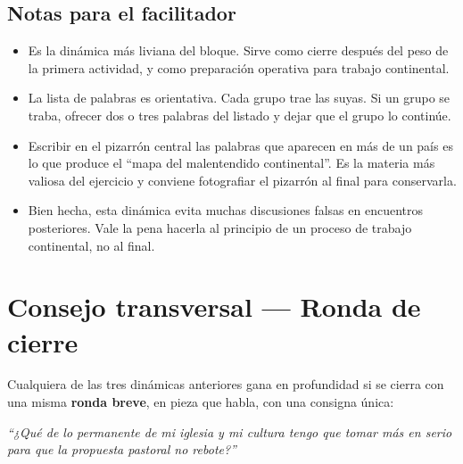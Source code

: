 \documentclass[11pt, a4paper]{article}
\begin{document}
\begin{actividad}
\subsection*{Notas para el facilitador}
\begin{itemize}
  \item Es la dinámica más liviana del bloque. Sirve como cierre después del peso de la primera actividad, y como preparación operativa para trabajo continental.
  \item La lista de palabras es orientativa. Cada grupo trae las suyas. Si un grupo se traba, ofrecer dos o tres palabras del listado y dejar que el grupo lo continúe.
  \item Escribir en el pizarrón central las palabras que aparecen en más de un país es lo que produce el ``mapa del malentendido continental''. Es la materia más valiosa del ejercicio y conviene fotografiar el pizarrón al final para conservarla.
  \item Bien hecha, esta dinámica evita muchas discusiones falsas en encuentros posteriores. Vale la pena hacerla al principio de un proceso de trabajo continental, no al final.
\end{itemize}

\end{actividad}

\newpage

\section*{Consejo transversal --- Ronda de cierre}

Cualquiera de las tres dinámicas anteriores gana en profundidad si se cierra con una misma \textbf{ronda breve}, en pieza que habla, con una consigna única:

\vspace{0.5em}

\begin{center}
\begin{tcolorbox}[
  enhanced, colback=territorioTierra, colframe=territorioTierra,
  boxrule=0pt, arc=3pt,
  left=18pt, right=18pt, top=16pt, bottom=16pt,
  width=0.86\linewidth,
  halign=center
]
  {\color{parch}\itshape\large ``¿Qué de lo permanente de mi iglesia y mi cultura tengo que tomar más en serio para que la propuesta pastoral no rebote?''}
\end{tcolorbox}
\end{center}
\end{document}
